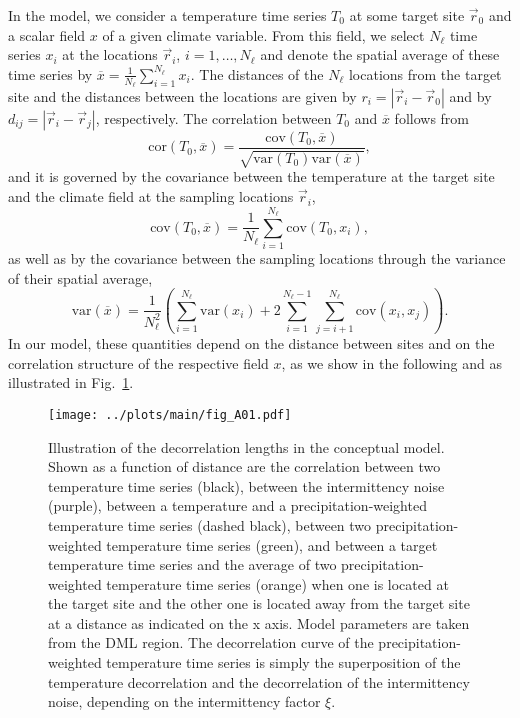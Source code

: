 \documentclass[cp]{copernicus}
\begin{document}
In the model, we consider a temperature time series $T_0$ at some target site
$\vec{r}_0$ and a scalar field $x$ of a given climate variable. From this field,
we select $N_{\ell}$ time series $x_i$ at the locations $\vec{r}_i$,
$i=1,\dotsc,N_{\ell}$ and denote the spatial average of these time series by
$\overline{x}=\frac{1}{N_{\ell}}\sum_{i=1}^{N_{\ell}}{x_i}$. The distances of
the $N_{\ell}$ locations from the target site and the distances between the
locations are given by $r_i=|\vec{r}_i-\vec{r}_0|$ and by
$d_{ij}=|{\vec{r}_i-\vec{r}_j}|$, respectively. The correlation between $T_0$
and $\overline{x}$ follows from
%
\begin{equation}
\label{eq:corr.general}
\mathrm{cor}\left(T_0,\overline{x}\right)=\frac
{\mathrm{cov}\left(T_0,\overline{x}\right)}
{\sqrt{\mathrm{var}\left(T_0\right)\mathrm{var}\left(\overline{x}\right)}},
\end{equation}
%
and it is governed by the covariance between the temperature at the target site
and the climate field at the sampling locations $\vec{r}_i$,
%
\begin{equation}
\label{eq:cov.general}
\mathrm{cov}\left(T_0,\overline{x}\right)=
\frac{1}{N_{\ell}}\sum_{i=1}^{N_{\ell}}{\mathrm{cov}\left(T_0,x_i\right)},
\end{equation}
%
as well as by the covariance between the sampling locations through the variance
of their spatial average,
\begin{equation}
\label{eq:var.general}
\mathrm{var}\left(\overline{x}\right)=
\frac{1}{N_{\ell}^2}\left(
\sum_{i=1}^{N_{\ell}}{\mathrm{var}(x_i)} +
2\sum_{i=1}^{N_{\ell}-1}\sum_{j=i+1}^{N_{\ell}}{\mathrm{cov}\left(x_i,x_j\right)}
\right).
\end{equation}
%
In our model, these quantities depend on the distance between sites and on the
correlation structure of the respective field $x$, as we show in the following
and as illustrated in Fig.~\ref{fig:conceptual.model.illustration}.

\begin{figure}[t]%
\centering
\texttt{[image: ../plots/main/fig\_A01.pdf]}
\caption{%
  Illustration of the decorrelation lengths in the conceptual model. Shown as a
  function of distance are the correlation between two temperature time series
  (black), between the intermittency noise (purple), between a temperature and a
  precipitation-weighted temperature time series (dashed black), between two
  precipitation-weighted temperature time series (green), and between a target
  temperature time series and the average of two precipitation-weighted
  temperature time series (orange) when one is located at the target site and
  the other one is located away from the target site at a distance as indicated
  on the x axis. Model parameters are taken from the DML region. The
  decorrelation curve of the precipitation-weighted temperature time series is
  simply the superposition of the temperature decorrelation and the
  decorrelation of the intermittency noise, depending on the intermittency
  factor $\xi$.}
\label{fig:conceptual.model.illustration}%
\end{figure}%
\end{document}
